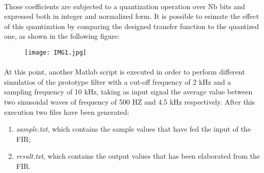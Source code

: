 \paragraph{}
Those coefficients are subjected to a quantization operation over Nb bits and expressed both in integer and normalized form.
It is possible to esimate the effect of this quantization by comparing the designed transfer function to the quantized one, as shown in the following figure: %
\begin{figure}[!ht]
	\texttt{[image: IMG1.jpg]}
	\centering
\end{figure}

\paragraph{}
At this point, another Matlab script is executed in order to perform
different simulatios of the prototype filter with a cut-off frequency of 2 kHz and a sampling frequency of 10 kHz, taking as 
input signal the average value between two sinusoidal waves of frequency of 500 HZ and 4.5 kHz respectively.
After this execution two files have been generated:

\begin{enumerate}
	\item \emph{sample.txt}, which contains the sample values that have fed the input of the FIR;
	\item \emph{result.txt}, which contains the output values that has been elaborated from the FIR.
\end{enumerate}

